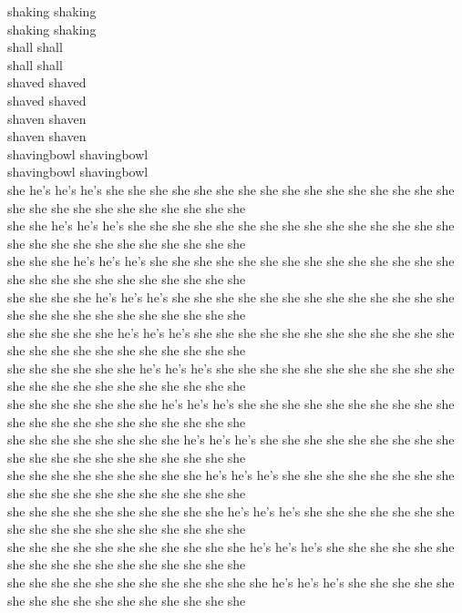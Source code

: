 shaking shaking\\
shaking shaking\\
shall shall\\
shall shall\\
shaved shaved\\
shaved shaved\\
shaven shaven\\
shaven shaven\\
shavingbowl shavingbowl\\
shavingbowl shavingbowl\\
she he's he's he's she she she she she she she she she she she she she she she she she she she she she she she she she she she\\
she she he's he's he's she she she she she she she she she she she she she she she she she she she she she she she she she she\\
she she she he's he's he's she she she she she she she she she she she she she she she she she she she she she she she she she\\
she she she she he's he's he's she she she she she she she she she she she she she she she she she she she she she she she she\\
she she she she she he's he's he's she she she she she she she she she she she she she she she she she she she she she she she\\
she she she she she she he's he's he's she she she she she she she she she she she she she she she she she she she she she she\\
she she she she she she she he's he's he's she she she she she she she she she she she she she she she she she she she she she\\
she she she she she she she she he's he's he's she she she she she she she she she she she she she she she she she she she she\\
she she she she she she she she she he's he's he's she she she she she she she she she she she she she she she she she she she\\
she she she she she she she she she she he's he's he's she she she she she she she she she she she she she she she she she she\\
she she she she she she she she she she she he's he's he's she she she she she she she she she she she she she she she she she\\
she she she she she she she she she she she she he's he's he's she she she she she she she she she she she she she she she she\\
